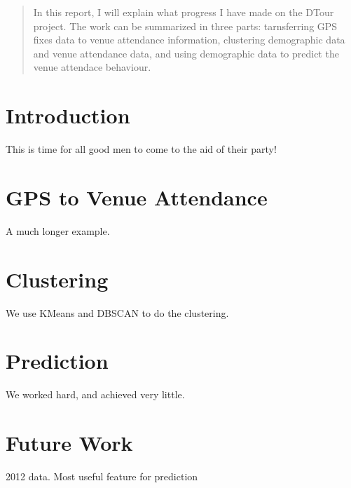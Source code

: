 \documentclass[12pt]{article}
\begin{document}
\maketitle

\begin{abstract}
In this report, I will explain what progress I have made on the DTour project. The work can be summarized in three parts: tarnsferring GPS fixes data to venue attendance information, clustering demographic data and venue attendance data, and using demographic data to predict the venue attendace behaviour.
\end{abstract}

\section{Introduction}
This is time for all good men to come to the aid of their party!

\section{GPS to Venue Attendance}\label{gps_venue}
A much longer \LaTeXe{} example. 

\section{Clustering}\label{clustering}
We use KMeans and DBSCAN \cite{Ester96} to do the clustering.

\section{Prediction}\label{prediction}
We worked hard, and achieved very little.

\section{Future Work}\label{future_work}
2012 data. Most useful feature for prediction



\end{document}
